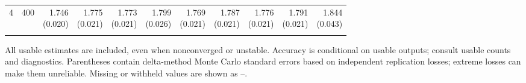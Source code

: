 \begin{table}[p]
{\begin{tabular}{llrrrrrrrrr}
4 & 400 & \shortstack{1.746\\(0.020)} & \shortstack{1.775\\(0.021)} & \shortstack{1.773\\(0.021)} & \shortstack{1.799\\(0.026)} & \shortstack{1.769\\(0.021)} & \shortstack{1.787\\(0.021)} & \shortstack{1.776\\(0.021)} & \shortstack{1.791\\(0.021)} & \shortstack{1.844\\(0.043)} \\
\addlinespace
\bottomrule\end{tabular}}
\par\medskip
\begin{minipage}{\linewidth}\footnotesize All usable estimates are included, even when nonconverged or unstable. Accuracy is conditional on usable outputs; consult usable counts and diagnostics. Parentheses contain delta-method Monte Carlo standard errors based on independent replication losses; extreme losses can make them unreliable.  Missing or withheld values are shown as --.\end{minipage}
\end{table}
